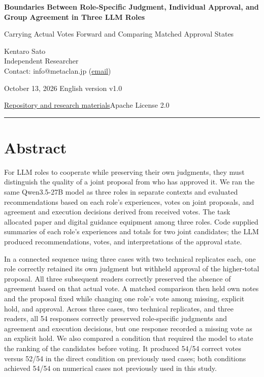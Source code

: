 \documentclass[10pt,a4paper]{article}
\begin{document}
\fontsize{10.7}{15.3}\selectfont\thispagestyle{first}
{\raggedright\sffamily\bfseries\color{ink}\fontsize{22}{27}\selectfont Boundaries Between Role-Specific Judgment, Individual Approval, and Group Agreement in Three LLM Roles\par}

{\raggedright\sffamily\fontsize{13}{17}\selectfont\color{accent} Carrying Actual Votes Forward and Comparing Matched Approval States\par}

{\small Kentaro Sato\\
Independent Researcher\\
Contact: info@metaclan.jp (\href{mailto:info@metaclan.jp}{email})

October 13, 2026 \textbar{} English version v1.0\par}
{\small \href{https://github.com/metaSATOKEN/MRSI/tree/9443de315d283874df0c27e0e99b8c04f400709d}{Repository and research materials}\quad\textbar\quad Apache License 2.0\par}\smallskip\hrule\medskip

\section{Abstract}\label{paper-04-abstract}

For LLM roles to cooperate while preserving their own judgments, they must distinguish the quality of a joint proposal from who has approved it. We ran the same Qwen3.5-27B model as three roles in separate contexts and evaluated recommendations based on each role's experiences, votes on joint proposals, and agreement and execution decisions derived from received votes. The task allocated paper and digital guidance equipment among three roles. Code supplied summaries of each role's experiences and totals for two joint candidates; the LLM produced recommendations, votes, and interpretations of the approval state.

In a connected sequence using three cases with two technical replicates each, one role correctly retained its own judgment but withheld approval of the higher-total proposal. All three subsequent readers correctly preserved the absence of agreement based on that actual vote. A matched comparison then held own notes and the proposal fixed while changing one role's vote among missing, explicit hold, and approval. Across three cases, two technical replicates, and three readers, all 54 responses correctly preserved role-specific judgments and agreement and execution decisions, but one response recorded a missing vote as an explicit hold. We also compared a condition that required the model to state the ranking of the candidates before voting. It produced 54/54 correct votes versus 52/54 in the direct condition on previously used cases; both conditions achieved 54/54 on numerical cases not previously used in this study.
\end{document}
